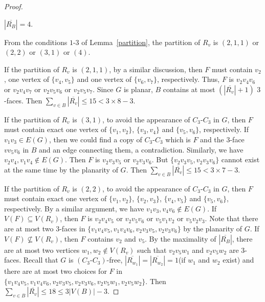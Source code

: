 \documentclass[10pt,a4paper]{amsart}
\begin{document}
\begin{proof}
    \begin{case} 
        $|\overline{R_B}|=4$.
    \end{case}
    
    From the conditions $1$-$3$ of Lemma~\ref{partition}, the partition of $R_v$ is $(2,1,1)$ or $(2,2)$ or $(3,1)$ or $(4)$.
    
    If the partition of $R_v$ is $(2,1,1)$, by a similar discussion, then $F$ must contain $v_2$, one vertex of $\{v_4,v_5\}$ and one vertex of $\{v_6,v_7\}$, respectively. Thus, $F$ is $v_2v_4v_6$ or $v_2v_4v_7$ or $v_2v_5v_6$ or $v_2v_5v_7$. Since $G$ is planar, $B$ contains at most $(|\overline{R_v}|+1)$ $3$-faces. Then $\sum_{v \in B}|\overline{R_v}| \leq 15 < 3\times8-3$.

    If the partition of $R_v$ is $(3,1)$, to avoid the appearance of $C_3\textbf{-}C_3$ in $G$, then $F$ must contain exact one vertex of $\{v_1,v_2\}$, $\{v_3,v_4\}$ and $\{v_5,v_6\}$, respectively. If $v_1v_3\in E(G)$, then we could find a copy of $C_3\textbf{-}C_3$ which is $F$ and the $3$-face $vv_5v_6$ in $B$ and an edge connecting them, a contradiction. Similarly, we have $v_2v_4, v_1v_4\notin E(G)$. Then $F$ is $v_2v_3v_5$ or $v_2v_3v_6$. But $\{v_2v_3v_5, v_2v_3v_6\}$ cannot exist at the same time by the planarity of $G$. Then $\sum_{v \in B}|\overline{R_v}| \leq 15 < 3\times7-3$.

    If the partition of $R_v$ is $(2,2)$, to avoid the appearance of $C_3\textbf{-}C_3$ in $G$, then $F$ must contain exact one vertex of $\{v_1,v_2\}$, $\{v_2,v_3\}$, $\{v_4,v_5\}$ and $\{v_5,v_6\}$, respectively. By a similar argument, we have $v_1v_3, v_4v_6\notin E(G)$. If $V(F)\subseteq V(R_v)$, then $F$ is $v_2v_4v_5$ or $v_2v_5v_6$ or $v_5v_1v_2$ or $v_5v_2v_3$. Note that there are at most two $3$-faces in $\{v_1v_4v_5, v_1v_4v_6, v_2v_3v_5, v_2v_3v_6\}$ by the planarity of $G$. If $V(F)\not\subseteq V(R_v)$, then $F$ contains $v_2$ and $v_5$. By the maximality of $|\overline{R_B}|$, there are at most two vertices $w_1,w_2\notin V(R_v)$ such that $v_2v_5w_1$ and $v_2v_5w_2$ are $3$-faces. Recall that $G$ is $(C_3\textbf{-}C_3)$-free, $|\overline{R_{w_1}}|=|\overline{R_{w_2}}|=1$(if $w_1$ and $w_2$ exist) and there are at most two choices for $F$ in $\{v_1v_4v_5, v_1v_4v_6, v_2v_3v_5, v_2v_3v_6, v_2v_5w_1, v_2v_5w_2 \}$. Then $\sum_{v \in B}|\overline{R_v}| \leq 18 \leq 3|V(B)|-3$.


\end{proof}
\end{document}
